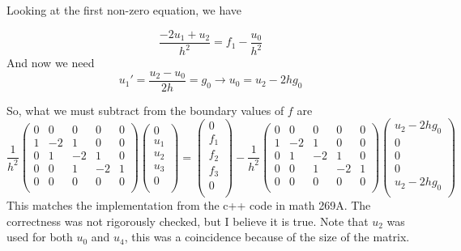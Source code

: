\documentclass[11pt]{article}
\begin{document}
Looking at the first non-zero equation, we have

\begin{equation}
\frac{-2u_1+u_2}{h^2} = f_1 - \frac{u_0}{h^2}
\end{equation}
And now we need
\begin{equation}
	u_1' = \frac{u_2 - u_0}{2h} = g_0
	\longrightarrow
	u_0 = u_2 - 2hg_0
\end{equation}

So, what we must subtract from the boundary values of $f$ are
\begin{equation}
\frac{1}{h^2}
 \begin{pmatrix}
  0 &  0 &  0 &  0 &  0 \\
  1 & -2 &  1 &  0 &  0 \\
  0 &  1 & -2 &  1 &  0 \\
  0 &  0 &  1 & -2 &  1 \\
  0 &  0 &  0 &  0 &  0 \\
 \end{pmatrix}
 \begin{pmatrix}
  0 \\  u_1 \\  u_2 \\  u_3 \\  0 \\
 \end{pmatrix}
  = 
 \begin{pmatrix}
  0 \\  f_1 \\  f_2 \\  f_3 \\  0 \\
 \end{pmatrix}
   -
\frac{1}{h^2}
 \begin{pmatrix}
  0 &  0 &  0 &  0 &  0 \\
  1 & -2 &  1 &  0 &  0 \\
  0 &  1 & -2 &  1 &  0 \\
  0 &  0 &  1 & -2 &  1 \\
  0 &  0 &  0 &  0 &  0 \\
 \end{pmatrix}
 \begin{pmatrix}
  u_2-2hg_0 \\  0 \\  0 \\  0 \\  u_2-2hg_0 \\
 \end{pmatrix}
\end{equation}
This matches the implementation from the c++ code in math 269A. The correctness was not rigorously checked, but I believe it is true. Note that $u_2$ was used for both $u_0$ and $u_4$, this was a coincidence because of the size of the matrix.
\end{document}
